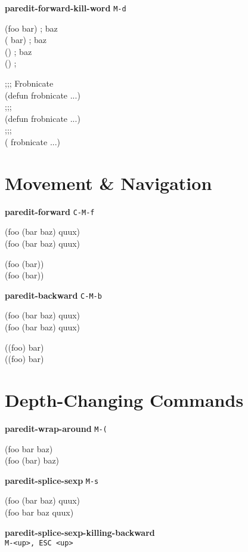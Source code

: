 \documentclass[10pt,landscape,a4paper]{article}
\begin{document}
\begin{multicols}{4}
\textbf{paredit-forward-kill-word} \texttt{M-d}

{\ttfamily
\cursor(foo bar) \space \space \space ; baz\\
(\cursor{} bar) \space \space \space ; baz\\
(\cursor) \space \space \space ; baz\\
() \space \space \space ;\cursor

;;;\cursor{} Frobnicate\\
(defun frobnicate ...)\\
;;;\cursor\\
(defun frobnicate ...)\\
;;;\\
(\cursor{} frobnicate ...)
}

    \section*{\large{Movement \& Navigation}}

\textbf{paredit-forward} \texttt{C-M-f}

{\ttfamily
(foo \cursor(bar baz) quux)\\
(foo (bar baz)\cursor{} quux)

(foo (bar)\cursor)\\
(foo (bar))\cursor
}

\textbf{paredit-backward} \texttt{C-M-b}

{\ttfamily
(foo (bar baz)\cursor{} quux)\\
(foo \cursor(bar baz) quux)

(\cursor(foo) bar)\\
\cursor((foo) bar)
}

    \section*{\large{Depth-Changing Commands}}

\textbf{paredit-wrap-around} \texttt{M-(}

{\ttfamily
(foo \cursor bar baz)\\
(foo (\cursor bar) baz)
}

\textbf{paredit-splice-sexp} \texttt{M-s}

{\ttfamily
(foo (bar\cursor{} baz) quux)\\
(foo bar\cursor{} baz quux)
}

\textbf{paredit-splice-sexp-killing-backward} \\\texttt{M-<up>, ESC <up>}


\end{multicols}
\end{document}
